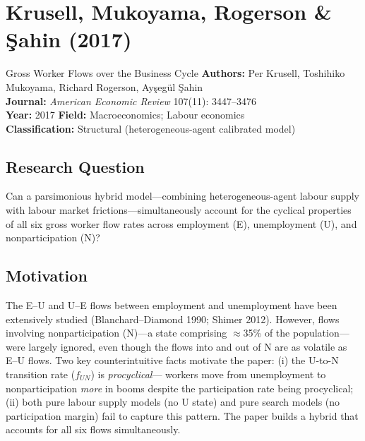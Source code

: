 \chapter{Krusell, Mukoyama, Rogerson \& \c{S}ahin (2017)}

\begin{paperbox}{Gross Worker Flows over the Business Cycle}
\textbf{Authors:} Per Krusell, Toshihiko Mukoyama, Richard Rogerson,
Ayşegül Şahin\\[3pt]
\textbf{Journal:} \textit{American Economic Review} 107(11): 3447--3476\\[3pt]
\textbf{Year:} 2017 \quad\textbf{Field:} Macroeconomics; Labour economics\\[3pt]
\textbf{Classification:} Structural (heterogeneous-agent calibrated model)
\end{paperbox}

\section{Research Question}

Can a parsimonious hybrid model---combining heterogeneous-agent labour supply
with labour market frictions---simultaneously account for the cyclical
properties of all six gross worker flow rates across employment (E),
unemployment (U), and nonparticipation (N)?

\section{Motivation}

The E--U and U--E flows between employment and unemployment have been
extensively studied (Blanchard--Diamond 1990; Shimer 2012). However, flows
involving nonparticipation (N)---a state comprising $\approx$35\% of the
population---were largely ignored, even though the flows into and out of N
are as volatile as E--U flows. Two key counterintuitive facts motivate the
paper: (i) the U-to-N transition rate ($f_{UN}$) is \emph{procyclical}---
workers move from unemployment to nonparticipation \emph{more} in booms
despite the participation rate being procyclical; (ii) both pure labour
supply models (no U state) and pure search models (no participation margin)
fail to capture this pattern. The paper builds a hybrid that accounts for
all six flows simultaneously.

